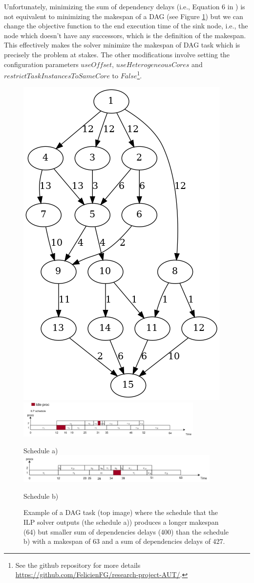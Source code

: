 Unfortunately, minimizing the sum of dependency delays (i.e., Equation 6 in \citet{yip2023letsynchronise}) is not equivalent
to minimizing the makespan of a DAG (see Figure \ref{fig:counter_example_minsumdep})
but we can change the objective function to the end execution time
of the sink node, i.e., the node which doesn't have any successors,
which is the definition of the makespan.
This effectively makes the solver minimize the makespan of DAG task
which is precisely the problem at stakes.
The other modifications involve setting the configuration parameters $useOffset$,
$useHeterogeneousCores$ and $restrictTaskInstancesToSameCore$ to
$False$\footnote{See the github repository for more details \url{https://github.com/FelicienFG/research-project-AUT/}.}.

\begin{figure}
    \centering
    \includegraphics[width=0.5\linewidth]{images/Tau_108.png}
    \includegraphics[width=\linewidth, height=70px]{images/schedule_ilp_fail_correct.png}
    \par Schedule a)
    \includegraphics[width=\linewidth, height=55px]{images/schedule_example_ilpfail_better.png}
    \par Schedule b)
    \caption{Example of a DAG task (top image) where the schedule that the ILP solver outputs (the schedule a))
    produces a longer makespan (64) but smaller sum of dependencies delays (400) than 
    the schedule b) with a makespan of 63 and a sum of dependencies delays of 427.}
    \label{fig:counter_example_minsumdep}
\end{figure}

